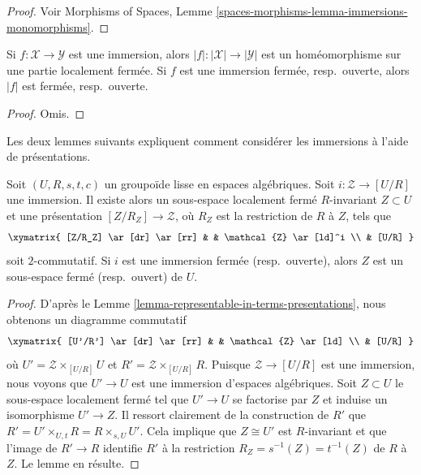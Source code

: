 \begin{proof}
Voir
Morphisms of Spaces,
Lemme \ref{spaces-morphisms-lemma-immersions-monomorphisms}.
\end{proof}

\begin{lemma}
\label{lemma-subspace-induced-topology}
Si $f : \mathcal{X} \to \mathcal{Y}$ est une immersion, alors
$|f| : |\mathcal{X}| \to |\mathcal{Y}|$ est un homéomorphisme
sur une partie localement fermée. Si $f$ est une immersion fermée, resp.\ ouverte,
alors $|f|$ est fermée, resp.\ ouverte.
\end{lemma}

\begin{proof}
Omis.
\end{proof}

\noindent
Les deux lemmes suivants expliquent comment considérer les
immersions à l'aide de présentations.

\begin{lemma}
\label{lemma-immersion-into-presentation}
Soit $(U, R, s, t, c)$ un groupoïde lisse en espaces algébriques.
Soit $i : \mathcal{Z} \to [U/R]$ une immersion.
Il existe alors un sous-espace localement fermé $R$-invariant
$Z \subset U$ et une présentation $[Z/R_Z] \to \mathcal{Z}$,
où $R_Z$ est la restriction de $R$ à $Z$, tels que
$$
\xymatrix{
[Z/R_Z] \ar[dr] \ar[rr] & & \mathcal{Z} \ar[ld]^i \\
& [U/R]
}
$$
soit $2$-commutatif. Si $i$ est une immersion fermée (resp.\ ouverte),
alors $Z$ est un sous-espace fermé (resp.\ ouvert) de $U$.
\end{lemma}

\begin{proof}
D'après le
Lemme \ref{lemma-representable-in-terms-presentations},
nous obtenons un diagramme commutatif
$$
\xymatrix{
[U'/R'] \ar[dr] \ar[rr] & & \mathcal{Z} \ar[ld] \\
& [U/R]
}
$$
où $U' = \mathcal{Z} \times_{[U/R]} U$ et
$R' = \mathcal{Z} \times_{[U/R]} R$.
Puisque $\mathcal{Z} \to [U/R]$ est une immersion, nous voyons que
$U' \to U$ est une immersion d'espaces algébriques. Soit $Z \subset U$
le sous-espace localement fermé tel que $U' \to U$ se factorise par
$Z$ et induise un isomorphisme $U' \to Z$.
Il ressort clairement de la construction de $R'$ que
$R' = U' \times_{U, t} R = R \times_{s, U} U'$.
Cela implique que $Z \cong U'$ est $R$-invariant et que l'image de
$R' \to R$ identifie $R'$ à la restriction
$R_Z = s^{-1}(Z) = t^{-1}(Z)$ de $R$ à $Z$. Le lemme en résulte.
\end{proof}

